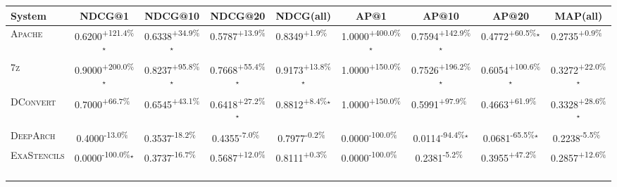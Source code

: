 \begin{table}[htbp]
\centering
\renewcommand{\arraystretch}{1.2}
\begin{tabular}{l|cccc|cccc}
\hline
System & NDCG@1 & NDCG@10 & NDCG@20 & NDCG(all) & AP@1 & AP@10 & AP@20 & MAP(all) \\ \hline
\textsc{Apache} & \cellcolor{green!30}0.6200\textsuperscript{+121.4\%}$^\star$ & \cellcolor{green!30}0.6338\textsuperscript{+34.9\%}$^\star$ & \cellcolor{green!30}0.5787\textsuperscript{+13.9\%}$^{\,\,\,}$ & \cellcolor{green!30}0.8349\textsuperscript{+1.9\%}$^{\,\,\,}$ & \cellcolor{green!30}1.0000\textsuperscript{+400.0\%}$^\star$ & \cellcolor{green!30}0.7594\textsuperscript{+142.9\%}$^\star$ & \cellcolor{green!30}0.4772\textsuperscript{+60.5\%}$^\star$ & \cellcolor{green!30}0.2735\textsuperscript{+0.9\%}$^{\,\,\,}$ \\
\textsc{7z} & \cellcolor{green!30}0.9000\textsuperscript{+200.0\%}$^\star$ & \cellcolor{green!30}0.8237\textsuperscript{+95.8\%}$^\star$ & \cellcolor{green!30}0.7668\textsuperscript{+55.4\%}$^\star$ & \cellcolor{green!30}0.9173\textsuperscript{+13.8\%}$^\star$ & \cellcolor{green!30}1.0000\textsuperscript{+150.0\%}$^{\,\,\,}$ & \cellcolor{green!30}0.7526\textsuperscript{+196.2\%}$^\star$ & \cellcolor{green!30}0.6054\textsuperscript{+100.6\%}$^\star$ & \cellcolor{green!30}0.3272\textsuperscript{+22.0\%}$^\star$ \\
\textsc{DConvert} & \cellcolor{green!30}0.7000\textsuperscript{+66.7\%}$^{\,\,\,}$ & \cellcolor{green!30}0.6545\textsuperscript{+43.1\%}$^{\,\,\,}$ & \cellcolor{green!30}0.6418\textsuperscript{+27.2\%}$^\star$ & \cellcolor{green!30}0.8812\textsuperscript{+8.4\%}$^\star$ & \cellcolor{green!30}1.0000\textsuperscript{+150.0\%}$^{\,\,\,}$ & \cellcolor{green!30}0.5991\textsuperscript{+97.9\%}$^{\,\,\,}$ & \cellcolor{green!30}0.4663\textsuperscript{+61.9\%}$^{\,\,\,}$ & \cellcolor{green!30}0.3328\textsuperscript{+28.6\%}$^\star$ \\
\textsc{DeepArch} & \cellcolor{red!30}0.4000\textsuperscript{-13.0\%}$^{\,\,\,}$ & \cellcolor{red!30}0.3537\textsuperscript{-18.2\%}$^{\,\,\,}$ & \cellcolor{red!30}0.4355\textsuperscript{-7.0\%}$^{\,\,\,}$ & \cellcolor{red!30}0.7977\textsuperscript{-0.2\%}$^{\,\,\,}$ & \cellcolor{red!30}0.0000\textsuperscript{-100.0\%}$^{\,\,\,}$ & \cellcolor{red!30}0.0114\textsuperscript{-94.4\%}$^\star$ & \cellcolor{red!30}0.0681\textsuperscript{-65.5\%}$^\star$ & \cellcolor{red!30}0.2238\textsuperscript{-5.5\%}$^{\,\,\,}$ \\
\textsc{ExaStencils} & \cellcolor{red!30}0.0000\textsuperscript{-100.0\%}$^\star$ & \cellcolor{red!30}0.3737\textsuperscript{-16.7\%}$^{\,\,\,}$ & \cellcolor{green!30}0.5687\textsuperscript{+12.0\%}$^{\,\,\,}$ & \cellcolor{green!30}0.8111\textsuperscript{+0.3\%}$^{\,\,\,}$ & \cellcolor{red!30}0.0000\textsuperscript{-100.0\%}$^{\,\,\,}$ & \cellcolor{red!30}0.2381\textsuperscript{-5.2\%}$^{\,\,\,}$ & \cellcolor{green!30}0.3955\textsuperscript{+47.2\%}$^{\,\,\,}$ & \cellcolor{green!30}0.2857\textsuperscript{+12.6\%}$^{\,\,\,}$ \\

\end{tabular}
\end{table}
